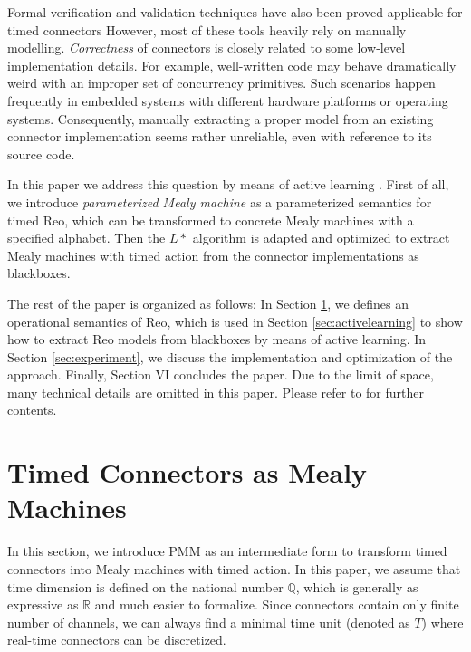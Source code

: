 \documentclass[conference, a4paper]{IEEEtran}
\begin{document}
Formal verification and validation techniques have also been proved applicable for timed connectors
\cite{DBLP:conf/tase/LiCWS15,DBLP:journals/scp/Kemper12} 
However, most of these tools heavily rely on manually modelling.
\emph{Correctness} of connectors is closely related to some low-level implementation details.
For example, well-written code may behave dramatically weird with an improper set of concurrency
primitives. Such scenarios happen frequently in embedded systems with different hardware platforms or
operating systems. Consequently, manually extracting a proper model from an existing connector
implementation seems rather unreliable, even with reference to its source code.

In this paper we address this question by means of active learning
\cite{DBLP:journals/iandc/Angluin87, DBLP:conf/fase/RaffeltS06}.
First of all, we introduce \emph{parameterized Mealy machine} as a parameterized
semantics for timed Reo, which can be transformed to concrete Mealy machines with a
specified alphabet. Then the $L*$ algorithm \cite{DBLP:journals/iandc/Angluin87} is adapted and
optimized to extract Mealy machines with timed action from the connector implementations as
blackboxes. 

The rest of the paper is organized as follows: In Section \ref{sec:semantics}, we defines an
operational semantics of Reo, which is used in Section \ref{sec:activelearning} to show how to
extract Reo models from blackboxes by means of active learning. In Section
\ref{sec:experiment}, we discuss the implementation and optimization of the approach. 
Finally, Section VI concludes the paper. Due to the limit of space, many technical details are
omitted in this paper.
Please refer to \cite{reo-learn-github} for further contents.


\section{Timed Connectors as Mealy Machines}
\label{sec:semantics}

In this section, we introduce PMM as an intermediate form to transform timed connectors into
Mealy machines with timed action. In this paper, we assume that time dimension is defined on the
national number $\mathbb{Q}$, which is generally as expressive as $\mathbb{R}$ and much easier to
formalize\cite{DBLP:journals/fmsd/PrabhakarDM015}. Since connectors contain only finite number of
channels, we can always find a minimal time unit (denoted as $T$) where real-time connectors can be
discretized.
\end{document}
